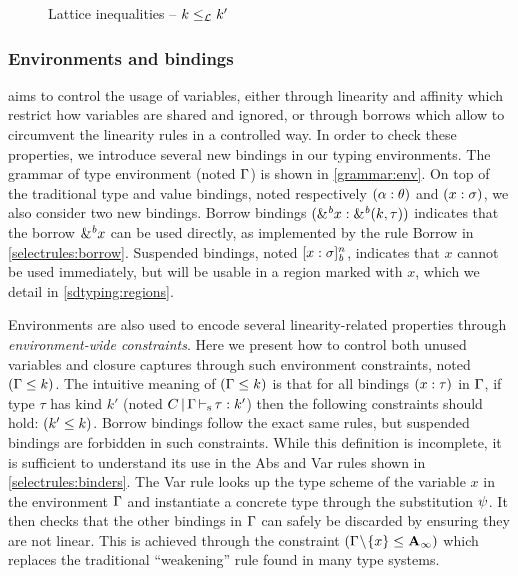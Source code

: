 \begin{figure*}[!h]
  
  \caption{Lattice inequalities -- $k \leq_\mathcal L k'$}
  \label{sdtyp:lattice}
\end{figure*}


\subsubsection{Environments and bindings}
\label{sdtyping:envs}

\lang aims to control the usage of variables, either
through
linearity and affinity which restrict how variables are shared and ignored,
or through borrows which allow to circumvent the linearity rules
in a controlled way.
In order to check these properties, we introduce several new bindings
in our typing environments.
The grammar of type environment (noted $\Gamma$) is shown in \cref{grammar:env}.
On top of the traditional type and value bindings, noted respectively
$(\alpha : \theta)$ and $(x : \sigma)$, we also consider two new
bindings.
Borrow bindings $({\&}^{\textit{b}}x : {\&}^{\textit{b}}(k,\tau))$ indicates
that the borrow ${\&}^{\textit{b}}x$ can be used directly, as implemented
by the rule {\sc Borrow} in \cref{selectrules:borrow}.
Suspended bindings, noted $[x : \sigma]_{\textit{b}}^n$, indicates that $x$
cannot be used immediately, but will be usable in a region
marked with $x$, which we detail in \cref{sdtyping:regions}.

Environments are also used to encode several linearity-related properties
through \emph{environment-wide constraints}.
Here we present how to control both unused variables and
closure captures through such environment constraints, noted $(\Gamma \leq k)$.
The intuitive meaning of $(\Gamma \leq k)$ is that for all bindings
$(x : \tau)$ in $\Gamma$,
if type $\tau$ has kind $k'$ (noted $C \operatorname{|} \Gamma \operatorname{\vdash_s} \tau : k'$)
then the following constraints should hold: $(k' \leq k)$.
Borrow bindings follow the exact same rules, but suspended bindings
are forbidden in such constraints.
While this definition is incomplete, it is sufficient to understand
its use in the {\sc Abs} and {\sc Var} rules shown in \cref{selectrules:binders}.
%
The {\sc Var} rule looks up the type scheme of the variable $x$ in
the environment $\Gamma$
and instantiate a concrete type through the substitution $\mathrm{\psi}$. It then
checks that the other bindings in $\Gamma$ can safely be discarded by
ensuring they are not linear. This is achieved through the constraint
$(\Gamma\!\setminus\!\{x\} \leq \mathbf{A}_\infty)$ which replaces the traditional
``weakening'' rule found in many type systems.

